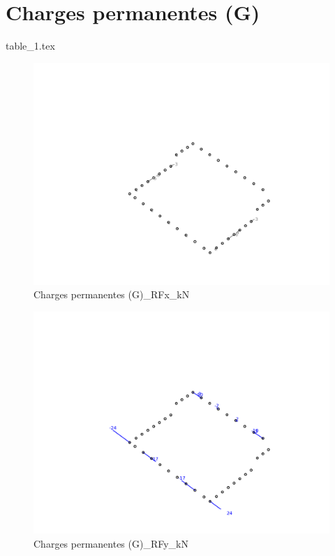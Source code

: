 
    \section{Charges permanentes (G)}
    {table_1.tex}

    \begin{figure}[H] %
        \centering %
        \includegraphics[width=\textwidth]{assets/img/graph3D_charges_cas_1_RFx_kN.png} %
        \caption{Charges permanentes (G)\_RFx\_kN} %
    \end{figure}

    \begin{figure}[H] %
        \centering %
        \includegraphics[width=\textwidth]{assets/img/graph3D_charges_cas_1_RFy_kN.png} %
        \caption{Charges permanentes (G)\_RFy\_kN} %
    \end{figure}

